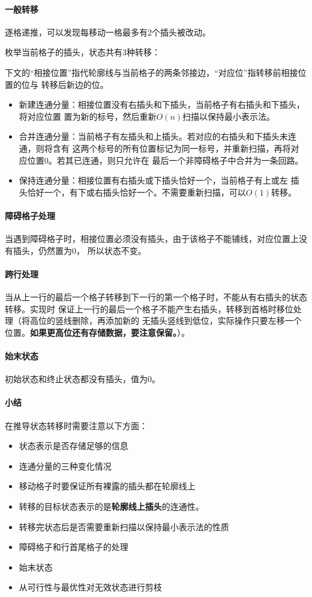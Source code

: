 \paragraph{一般转移}
逐格递推，可以发现每移动一格最多有2个插头被改动。

枚举当前格子的插头，状态共有3种转移：

下文的``相接位置''指代轮廓线与当前格子的两条邻接边，``对应位''指转移前相接位置的位与
转移后新边的位。
\begin{itemize}
    \item 新建连通分量：相接位置没有右插头和下插头，当前格子有右插头和下插头，将对应位置
    置为新的标号，然后重新$O(n)$扫描以保持最小表示法。
    \item 合并连通分量：当前格子有左插头和上插头。若对应的右插头和下插头未连通，则将含有
    这两个标号的所有位置标记为同一标号，并重新扫描，再将对应位置0。若其已连通，则只允许在
    最后一个非障碍格子中合并为一条回路。
    \item 保持连通分量：相接位置有右插头或下插头恰好一个，当前格子有上或左
    插头恰好一个，有下或右插头恰好一个。不需要重新扫描，可以$O(1)$转移。
\end{itemize}
\paragraph{障碍格子处理}
当遇到障碍格子时，相接位置必须没有插头，由于该格子不能铺线，对应位置上没有插头，仍然置为0，
所以状态不变。
\paragraph{跨行处理}
当从上一行的最后一个格子转移到下一行的第一个格子时，不能从有右插头的状态转移。实现时
保证上一行的最后一个格子不能产生右插头，转移到首格时移位处理（将高位的竖线删除，再添加新的
无插头竖线到低位，实际操作只要左移一个位置。{\bfseries 如果更高位还有存储数据，要注意保留。}）。
\paragraph{始末状态}
初始状态和终止状态都没有插头，值为0。
\paragraph{小结}
在推导状态转移时需要注意以下方面：
\begin{itemize}
    \item 状态表示是否存储足够的信息
    \item 连通分量的三种变化情况
    \item 移动格子时要保证所有裸露的插头都在轮廓线上
    \item 转移的目标状态表示的是{\bfseries 轮廓线上插头}的连通性。
    \item 转移完状态后是否需要重新扫描以保持最小表示法的性质
    \item 障碍格子和行首尾格子的处理
    \item 始末状态
    \item 从可行性与最优性对无效状态进行剪枝
\end{itemize}
